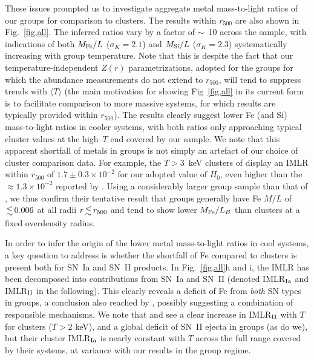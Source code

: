 \documentclass[useAMS,usenatbib]{mn2e}
\begin{document}
These issues prompted us to investigate aggregate metal mass-to-light
ratios of our groups for comparison to clusters. The results within
$r_{500}$ are also shown in Fig.~\ref{fig,all}. The inferred ratios
vary by a factor of $\sim$~10 across the sample, with indications of
both $M_{\rm Fe}/L$ ($\sigma_K=2.1$) and $M_{\rm Si}/L$
($\sigma_K=2.3$) systematically increasing with group temperature.
Note that this is despite the fact that our temperature-independent
$Z(r)$ parametrizations, adopted for the groups for which the
abundance measurements do not extend to $r_{500}$, will tend to
suppress trends with $\langle T \rangle$ (the main motivation for
showing Fig~\ref{fig,all} in its current form is to facilitate
comparison to more massive systems, for which results are typically
provided within $r_{500}$). The results clearly suggest lower Fe (and
Si) mass-to-light ratios in cooler systems, with both ratios only
approaching typical cluster values at the high--$T$ end covered by our
sample. We note that this apparent shortfall of metals in groups is
not simply an artefact of our choice of cluster comparison data. For
example, the $T>3$~keV clusters of \citet{degr04} display an IMLR
within $r_{500}$ of $1.7\pm 0.3\times 10^{-2}$ for our adopted value
of $H_0$, even higher than the $\approx 1.3\times 10^{-2}$ reported by
\citet{fino03}.
Using a considerably larger group sample than that of \citet{fino00},
we thus confirm their tentative result that groups generally have Fe
$M/L$ of $\la 0.006$ at all radii $r\la r_{500}$ and tend to show
lower $M_{\rm Fe}/L_B$ than clusters at a fixed overdensity radius.

In order to infer the origin of the lower metal mass-to-light ratios
in cool systems, a key question to address is whether the shortfall of
Fe compared to clusters is present both for SN~Ia and SN~II products.
In Fig.~\ref{fig,all}h and i, the IMLR has been decomposed into
contributions from SN~Ia and SN~II (denoted IMLR$_{\rm Ia}$ and
IMLR$_{\rm II}$ in the following). This clearly reveals a deficit of
Fe from {\em both} SN types in groups, a conclusion also reached by
\citet{fino99}, possibly suggesting a combination of responsible
mechanisms. We note that \citet{fino99} and \citet{fino01} see a clear
increase in IMLR$_{\rm II}$ with $T$ for clusters ($T>2$ keV), and a
global deficit of SN~II ejecta in groups (as do we), but their cluster
IMLR$_{\rm Ia}$ is nearly constant with $T$ across the full range
covered by their systems, at variance with our results in the group
regime.
\end{document}
